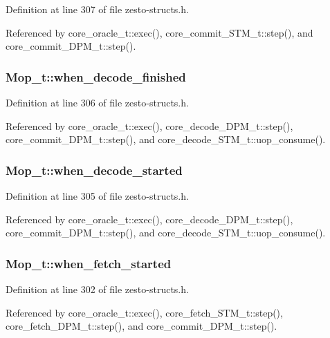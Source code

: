 Definition at line 307 of file zesto-structs.h.

Referenced by core\_\-oracle\_\-t::exec(), core\_\-commit\_\-STM\_\-t::step(), and core\_\-commit\_\-DPM\_\-t::step().
\subsubsection[{when\_\-decode\_\-finished}]{ {\bf Mop\_\-t::when\_\-decode\_\-finished}}\label{structMop__t_d1e4ae6820210aefb1091db30d72f2a8}




Definition at line 306 of file zesto-structs.h.

Referenced by core\_\-oracle\_\-t::exec(), core\_\-decode\_\-DPM\_\-t::step(), core\_\-commit\_\-DPM\_\-t::step(), and core\_\-decode\_\-STM\_\-t::uop\_\-consume().
\subsubsection[{when\_\-decode\_\-started}]{ {\bf Mop\_\-t::when\_\-decode\_\-started}}\label{structMop__t_d07da636f69ae00564cc491a2efc2a95}




Definition at line 305 of file zesto-structs.h.

Referenced by core\_\-oracle\_\-t::exec(), core\_\-decode\_\-DPM\_\-t::step(), core\_\-commit\_\-DPM\_\-t::step(), and core\_\-decode\_\-STM\_\-t::uop\_\-consume().
\subsubsection[{when\_\-fetch\_\-started}]{ {\bf Mop\_\-t::when\_\-fetch\_\-started}}\label{structMop__t_074734a2c4989bb09528dc993321a01b}




Definition at line 302 of file zesto-structs.h.

Referenced by core\_\-oracle\_\-t::exec(), core\_\-fetch\_\-STM\_\-t::step(), core\_\-fetch\_\-DPM\_\-t::step(), and core\_\-commit\_\-DPM\_\-t::step().
